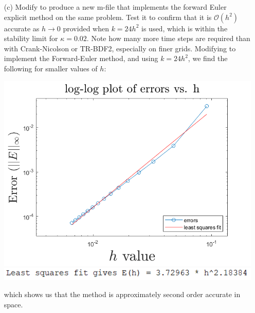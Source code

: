 \documentclass{article}
\begin{document}
\begin{itemize}
    \item[(c)] Modify  to produce a new m-file  that implements the forward Euler explicit method on the same problem. Test it to confirm that it is $\mathcal{O}(h^2)$ accurate as $h \to 0$ provided when $k = 24h^2$ is used, which is within the stability limit for $\kappa = 0.02$. Note how many more time steps are required than with Crank-Nicolson or TR-BDF2, especially on finer grids.
    \newline\newline
    Modifying  to implement the Forward-Euler method, and using $k = 24h^2$, we find the following for smaller values of $h$:
    \begin{center}
        \includegraphics[scale = 0.6]{loglogerrorforFE.png}
        \newline
        \includegraphics[scale = 0.8]{FEorder.PNG}
    \end{center}
    which shows us that the method is approximately second order accurate in space.
    

\end{itemize}
\end{document}

